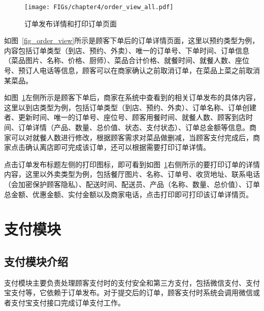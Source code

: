 \begin{figure}[htbp!]
    \centering
    \texttt{[image: FIGs/chapter4/order\_view\_all.pdf]}
    \caption{订单发布详情和打印订单页面}\label{fig_order_detail}
\end{figure}

如图~\ref{fig_order_view}所示是顾客下单后的订单详情页面，这里以预约类型为例，内容包括订单类型（到店、预约、外卖）、唯一的订单号、下单时间、订单信息（菜品图片、名称、价格、厨师）、菜品合计价格、就餐时间、就餐人数、座位号、预订人电话等信息，顾客可以在商家确认之前取消订单，在菜品上菜之前取消某菜品。

如图~\ref{fig_order_detail}左侧所示是顾客下单后，商家在系统中查看到的相关订单发布的具体内容，这里以到店类型为例，包括订单类型（到店、预约、外卖）、订单名称、订单创建者、更新时间、唯一的订单号、座位号、顾客用餐时间、就餐人数、顾客到店时间、订单详情（产品、数量、总价值、状态、支付状态）、订单总金额等信息。商家可以对就餐人数进行修改，根据顾客需求对菜品做删减，当顾客支付完成后，商家点击确认离店即可完成该订单，还可以根据需要打印订单详情。

点击订单发布标题左侧的打印图标，即可看到如图~\ref{fig_order_detail}右侧所示的要打印订单的详情内容，这里以外卖类型为例，包括餐厅图片、名称、订单号、收货地址、联系电话（会加密保护顾客隐私）、配送时间、配送员、产品（名称、数量、总价值）、订单总金额、优惠金额、实付金额以及商家电话，点击打印即可打印该订单详情页。\\


\section{支付模块}
\subsection{支付模块介绍}
支付模块主要负责处理顾客支付时的支付安全和第三方支付，包括微信支付、支付宝支付等，它依赖于订单发布。对于提交后的订单，顾客支付时系统会调用微信或者支付宝支付接口完成订单支付工作。\\

